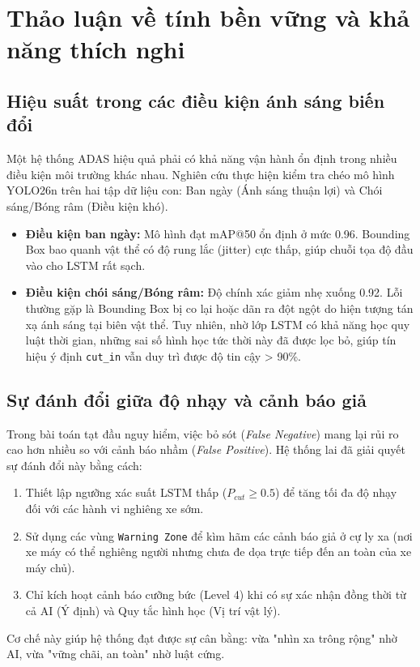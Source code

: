\section{Thảo luận về tính bền vững và khả năng thích nghi}
\subsection{Hiệu suất trong các điều kiện ánh sáng biến đổi}
Một hệ thống ADAS hiệu quả phải có khả năng vận hành ổn định trong nhiều điều kiện môi trường khác nhau. Nghiên cứu thực hiện kiểm tra chéo mô hình YOLO26n trên hai tập dữ liệu con: Ban ngày (Ánh sáng thuận lợi) và Chói sáng/Bóng râm (Điều kiện khó).

\begin{itemize}
    \item \textbf{Điều kiện ban ngày:} Mô hình đạt mAP@50 ổn định ở mức 0.96. Bounding Box bao quanh vật thể có độ rung lắc (jitter) cực thấp, giúp chuỗi tọa độ đầu vào cho LSTM rất sạch.
    \item \textbf{Điều kiện chói sáng/Bóng râm:} Độ chính xác giảm nhẹ xuống 0.92. Lỗi thường gặp là Bounding Box bị co lại hoặc dãn ra đột ngột do hiện tượng tán xạ ánh sáng tại biên vật thể. Tuy nhiên, nhờ lớp LSTM có khả năng học quy luật thời gian, những sai số hình học tức thời này đã được lọc bỏ, giúp tín hiệu ý định \texttt{cut\_in} vẫn duy trì được độ tin cậy > 90\%.
\end{itemize}

\subsection{Sự đánh đổi giữa độ nhạy và cảnh báo giả}
Trong bài toán tạt đầu nguy hiểm, việc bỏ sót (\textit{False Negative}) mang lại rủi ro cao hơn nhiều so với cảnh báo nhầm (\textit{False Positive}). 
Hệ thống lai đã giải quyết sự đánh đổi này bằng cách:
\begin{enumerate}
    \item Thiết lập ngưỡng xác suất LSTM thấp ($P_{cut} \geq 0.5$) để tăng tối đa độ nhạy đối với các hành vi nghiêng xe sớm.
    \item Sử dụng các vùng \texttt{Warning Zone} để kìm hãm các cảnh báo giả ở cự ly xa (nơi xe máy có thể nghiêng người nhưng chưa đe dọa trực tiếp đến an toàn của xe máy chủ).
    \item Chỉ kích hoạt cảnh báo cưỡng bức (Level 4) khi có sự xác nhận đồng thời từ cả AI (Ý định) và Quy tắc hình học (Vị trí vật lý).
\end{enumerate}
Cơ chế này giúp hệ thống đạt được sự cân bằng: vừa "nhìn xa trông rộng" nhờ AI, vừa "vững chãi, an toàn" nhờ luật cứng.